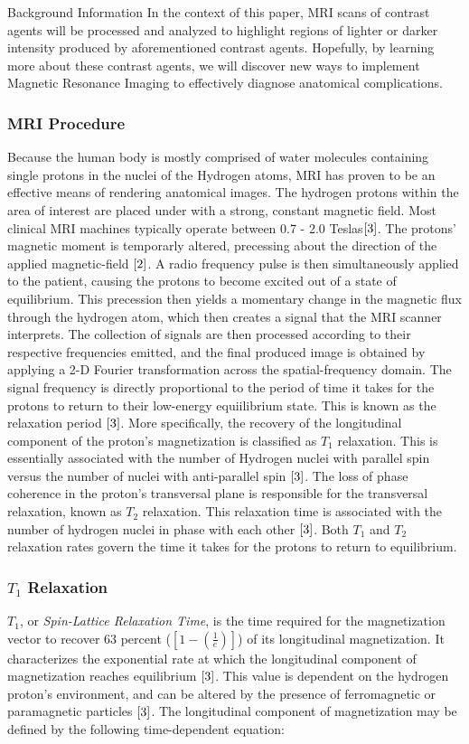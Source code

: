 \documentclass[a4paper,12pt]{article}
\begin{document}
\begin{section}{Background Information}
In the context of this paper, MRI scans of contrast agents will be processed and analyzed to highlight regions of lighter or darker intensity produced by aforementioned contrast agents. Hopefully, by learning more about these contrast agents, we will discover new ways to implement Magnetic Resonance Imaging to effectively diagnose anatomical complications.


\newpage
\subsubsection{MRI Procedure}
Because the human body is mostly comprised of water molecules containing single protons in the nuclei of the Hydrogen atoms, MRI has proven to be an effective means of rendering anatomical images. The hydrogen protons within the area of interest are placed under with a strong, constant magnetic field.
Most clinical MRI machines typically operate between 0.7 - 2.0 Teslas$\cite{3}$. 
The protons' magnetic moment is temporarly altered, precessing about the direction of the applied magnetic-field $\cite{2}$. 
A radio frequency pulse is then simultaneously applied to the patient, causing the protons to become excited out of a state of equilibrium.
This precession then yields a momentary change in the magnetic flux through the hydrogen atom, which then creates a signal that the MRI scanner interprets. The collection of signals are then processed according to their respective frequencies emitted, and the final produced image is obtained by applying a 2-D Fourier transformation across the spatial-frequency domain. 
The signal frequency is directly proportional to the period of time it takes for the protons to return to their low-energy equiilibrium state. This is known as the relaxation period $\cite{3}$. 
More specifically, the recovery of the longitudinal component of the proton's magnetization is classified as $T_1$ relaxation. This is essentially associated with the number of Hydrogen nuclei with parallel spin versus the number of nuclei with anti-parallel spin $\cite{3}$. 
The loss of phase coherence in the proton's transversal plane is responsible for the transversal relaxation, known as $T_2$ relaxation. This relaxation time is associated with the number of hydrogen nuclei in phase with each other $\cite{3}$. 
Both $T_1$ and $T_2$ relaxation rates govern the time it takes for the protons to return to equilibrium.


\newpage
\subsubsection{$T_1$ Relaxation}
$T_1$, or {\em Spin-Lattice Relaxation Time}, is the time required for the magnetization vector to recover 63 percent ($[1-(\frac{1}{e})]$) of its longitudinal magnetization. It characterizes the exponential rate at which the longitudinal component of magnetization reaches equilibrium $\cite{3}$. This value is dependent on the hydrogen proton's environment, and can be altered by the presence of ferromagnetic or paramagnetic particles $\cite{3}$. The longitudinal component of magnetization may be defined by the following time-dependent equation:


\end{section}
\end{document}
